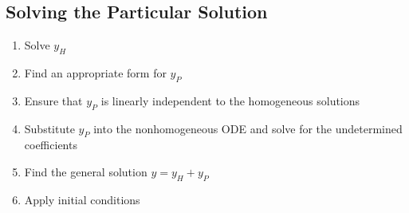 \documentclass{article}
\begin{document}
\subsection{Solving the Particular Solution}
\begin{enumerate}
    \item Solve \(y_H\)
    \item Find an appropriate form for \(y_P\)
    \item Ensure that \(y_P\) is linearly independent to the homogeneous solutions
    \item Substitute \(y_P\) into the nonhomogeneous ODE and solve for the undetermined coefficients
    \item Find the general solution \(y = y_H + y_P\)
    \item Apply initial conditions
\end{enumerate}
\end{document}
